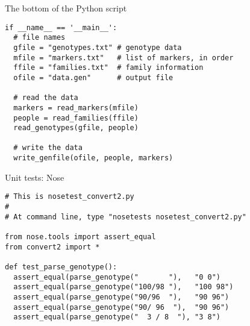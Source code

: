 \documentclass[12pt,t]{beamer}
\begin{document}
\begin{frame}[fragile]{The bottom of the Python script}

\vspace{18pt}

\begin{lstlisting}
if __name__ == '__main__':
  # file names
  gfile = "genotypes.txt" # genotype data
  mfile = "markers.txt"   # list of markers, in order
  ffile = "families.txt"  # family information
  ofile = "data.gen"      # output file

  # read the data
  markers = read_markers(mfile)
  people = read_families(ffile)
  read_genotypes(gfile, people)

  # write the data
  write_genfile(ofile, people, markers)
\end{lstlisting}

\end{frame}



\begin{frame}[fragile]{Unit tests: Nose}

\vspace{18pt}

\begin{lstlisting}
# This is nosetest_convert2.py
#
# At command line, type "nosetests nosetest_convert2.py"

from nose.tools import assert_equal
from convert2 import *

def test_parse_genotype():
  assert_equal(parse_genotype("       "),   "0 0")
  assert_equal(parse_genotype("100/98 "),   "100 98")
  assert_equal(parse_genotype("90/96  "),   "90 96")
  assert_equal(parse_genotype("90/ 96  "),  "90 96")
  assert_equal(parse_genotype("  3 / 8  "), "3 8")
\end{lstlisting}

\end{frame}
\end{document}
